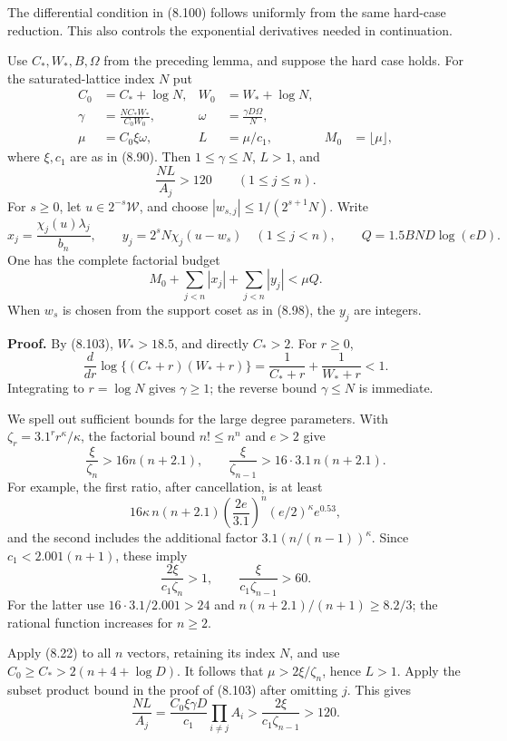 \documentclass[
  11pt,
  a4paper,
]{article}
\begin{document}
The differential condition in (8.100) follows uniformly from the same
hard-case reduction. This also controls the exponential derivatives
needed in continuation.

Use \(C_*,W_*,B,\Omega\) from the preceding lemma, and suppose the hard
case holds. For the saturated-lattice index \(N\) put \[
\begin{aligned}
C_0&=C_*+\log N,& W_0&=W_*+\log N,\\
\gamma&=\frac{NC_*W_*}{C_0W_0},&
\omega&=\frac{\gamma D\Omega}{N},\\
\mu&=C_0\xi\omega,&
L&=\mu/c_1,& M_0&=\lfloor\mu\rfloor,
\end{aligned}
\] where \(\xi,c_1\) are as in (8.90). Then \(1\le\gamma\le N\),
\(L>1\), and \[
\frac{NL}{A_j}>120\qquad(1\le j\le n).
\] For \(s\ge0\), let \(u\in2^{-s}\mathcal W\), and choose
\(|w_{s,j}|\le1/(2^{s+1}N)\). Write \[
x_j=\frac{\chi_j(u)\lambda_j}{b_n},\qquad
y_j=2^sN\chi_j(u-w_s)\quad(1\le j<n),\qquad
Q=1.5BND\log(eD).
\] One has the complete factorial budget \[
M_0+\sum_{j<n}|x_j|+\sum_{j<n}|y_j|<\mu Q.
\tag{8.104}
\] When \(w_s\) is chosen from the support coset as in (8.98), the
\(y_j\) are integers.

\textbf{Proof.} By (8.103), \(W_*>18.5\), and directly \(C_*>2\). For
\(r\ge0\), \[
\frac d{dr}\log\{(C_*+r)(W_*+r)\}
=\frac1{C_*+r}+\frac1{W_*+r}<1.
\] Integrating to \(r=\log N\) gives \(\gamma\ge1\); the reverse bound
\(\gamma\le N\) is immediate.

We spell out sufficient bounds for the large degree parameters. With
\(\zeta_r=3.1^rr^\kappa/\kappa\), the factorial bound \(n!\le n^n\) and
\(e>2\) give \[
\frac{\xi}{\zeta_n}>16n(n+2.1),\qquad
\frac{\xi}{\zeta_{n-1}}>16\cdot3.1\,n(n+2.1).
\] For example, the first ratio, after cancellation, is at least \[
16\kappa\,n(n+2.1)
\left(\frac{2e}{3.1}\right)^n(e/2)^\kappa e^{0.53},
\] and the second includes the additional factor
\(3.1(n/(n-1))^\kappa\). Since \(c_1<2.001(n+1)\), these imply \[
\frac{2\xi}{c_1\zeta_n}>1,\qquad
\frac{\xi}{c_1\zeta_{n-1}}>60.
\] For the latter use \(16\cdot3.1/2.001>24\) and
\(n(n+2.1)/(n+1)\ge8.2/3\); the rational function increases for
\(n\ge2\).

Apply (8.22) to all \(n\) vectors, retaining its index \(N\), and use
\(C_0\ge C_*>2(n+4+\log D)\). It follows that \(\mu>2\xi/\zeta_n\),
hence \(L>1\). Apply the subset product bound in the proof of (8.103)
after omitting \(j\). This gives \[
\frac{NL}{A_j}
=\frac{C_0\xi\gamma D}{c_1}\prod_{i\ne j}A_i
>\frac{2\xi}{c_1\zeta_{n-1}}>120.
\]
\end{document}
